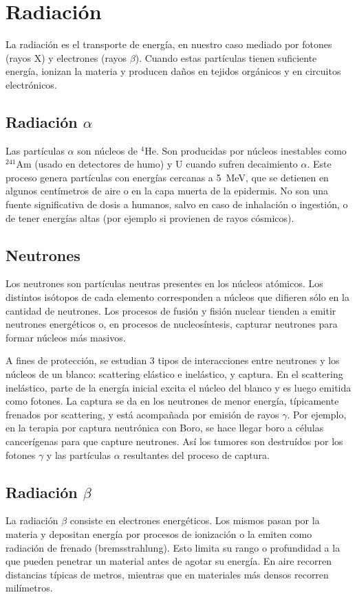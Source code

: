 \section{Radiación}
\label{sec:radiacion}
La radiación es el transporte de energía,
en nuestro caso mediado por fotones (rayos X) y electrones (rayos $\beta$).
Cuando estas partículas tienen suficiente energía, 
ionizan la materia y producen daños en tejidos orgánicos
y en circuitos electrónicos.
%
\subsection{Radiación $\alpha$}
Las partículas $\alpha$ son núcleos de $^4$He.
Son producidas por núcleos inestables como
$^{241}$Am (usado en detectores de humo) y U 
cuando sufren decaimiento $\alpha$.
Este proceso genera partículas con energías cercanas a 
\SI{5}{\mega\electronvolt},
que se detienen en algunos centímetros de aire 
o en la capa muerta de la epidermis.
No son una fuente significativa de dosis a humanos,
salvo en caso de inhalación o ingestión,
o de tener energías altas
(por ejemplo si provienen de rayos cósmicos).
\subsection{Neutrones}
Los neutrones son partículas neutras presentes en los núcleos atómicos.
Los distintos isótopos de cada elemento corresponden a núcleos que difieren
sólo en la cantidad de neutrones.
Los procesos de fusión y fisión nuclear tienden a emitir neutrones energéticos
o,
en procesos de nucleosíntesis,
capturar neutrones para formar núcleos más masivos.

A fines de protección, se estudian 3 tipos de interacciones entre neutrones
y los núcleos de un blanco:
scattering elástico e inelástico, y captura.
En el scattering inelástico,
parte de la energía inicial excita el núcleo del blanco y es luego emitida como
fotones.
La captura se da en los neutrones de menor energía,
típicamente frenados por scattering,
y está acompañada por emisión de rayos $\gamma$.
Por ejemplo, en la terapia por captura neutrónica con Boro,
se hace llegar boro a células cancerígenas para que capture neutrones.
Así los tumores son destruídos por los fotones $\gamma$ y las partículas 
$\alpha$ resultantes del proceso de captura.
\subsection{Radiación $\beta$}
La radiación $\beta$ consiste en electrones energéticos.
Los mismos pasan por la materia y depositan energía por procesos de ionización 
o la emiten como radiación de frenado (bremsstrahlung).
Esto limita su rango o profundidad a la que pueden penetrar un material antes
de agotar su energía.
En aire recorren distancias típicas de metros, 
mientras que en materiales más densos recorren milímetros.

